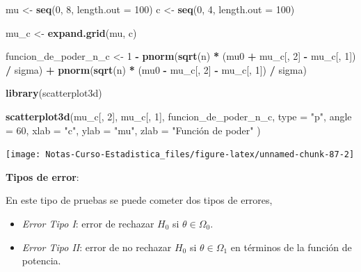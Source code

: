 \documentclass[
  12pt,
]{book}
\newenvironment{Shaded}{\begin{snugshade}}{\end{snugshade}}
\newcommand{\DataTypeTok}[1]{\textcolor[rgb]{0.13,0.29,0.53}{#1}}
\newcommand{\DecValTok}[1]{\textcolor[rgb]{0.00,0.00,0.81}{#1}}
\newcommand{\KeywordTok}[1]{\textcolor[rgb]{0.13,0.29,0.53}{\textbf{#1}}}
\newcommand{\NormalTok}[1]{#1}
\newcommand{\OperatorTok}[1]{\textcolor[rgb]{0.81,0.36,0.00}{\textbf{#1}}}
\newcommand{\StringTok}[1]{\textcolor[rgb]{0.31,0.60,0.02}{#1}}
\begin{document}
\begin{Shaded}
\begin{Highlighting}[]
\NormalTok{mu \textless{}{-}}\StringTok{ }\KeywordTok{seq}\NormalTok{(}\DecValTok{0}\NormalTok{, }\DecValTok{8}\NormalTok{, }\DataTypeTok{length.out =} \DecValTok{100}\NormalTok{)}
\NormalTok{c \textless{}{-}}\StringTok{ }\KeywordTok{seq}\NormalTok{(}\DecValTok{0}\NormalTok{, }\DecValTok{4}\NormalTok{, }\DataTypeTok{length.out =} \DecValTok{100}\NormalTok{)}

\NormalTok{mu\_c \textless{}{-}}\StringTok{ }\KeywordTok{expand.grid}\NormalTok{(mu, c)}

\NormalTok{funcion\_de\_poder\_n\_c \textless{}{-}}\StringTok{ }\DecValTok{1} \OperatorTok{{-}}
\StringTok{  }\KeywordTok{pnorm}\NormalTok{(}\KeywordTok{sqrt}\NormalTok{(n) }\OperatorTok{*}\StringTok{ }\NormalTok{(mu0 }\OperatorTok{+}\StringTok{ }\NormalTok{mu\_c[, }\DecValTok{2}\NormalTok{] }\OperatorTok{{-}}\StringTok{ }\NormalTok{mu\_c[, }\DecValTok{1}\NormalTok{]) }\OperatorTok{/}\StringTok{ }\NormalTok{sigma) }\OperatorTok{+}
\StringTok{  }\KeywordTok{pnorm}\NormalTok{(}\KeywordTok{sqrt}\NormalTok{(n) }\OperatorTok{*}\StringTok{ }\NormalTok{(mu0 }\OperatorTok{{-}}\StringTok{ }\NormalTok{mu\_c[, }\DecValTok{2}\NormalTok{] }\OperatorTok{{-}}\StringTok{ }\NormalTok{mu\_c[, }\DecValTok{1}\NormalTok{]) }\OperatorTok{/}\StringTok{ }\NormalTok{sigma)}

\KeywordTok{library}\NormalTok{(scatterplot3d)}

\KeywordTok{scatterplot3d}\NormalTok{(mu\_c[, }\DecValTok{2}\NormalTok{], mu\_c[, }\DecValTok{1}\NormalTok{], funcion\_de\_poder\_n\_c,}
  \DataTypeTok{type =} \StringTok{"p"}\NormalTok{, }\DataTypeTok{angle =} \DecValTok{60}\NormalTok{,}
  \DataTypeTok{xlab =} \StringTok{"c"}\NormalTok{, }\DataTypeTok{ylab =} \StringTok{"mu"}\NormalTok{, }\DataTypeTok{zlab =} \StringTok{"Función de poder"}
\NormalTok{)}
\end{Highlighting}
\end{Shaded}

\begin{center}\texttt{[image: Notas-Curso-Estadistica\_files/figure-latex/unnamed-chunk-87-2]} \end{center}

\textbf{Tipos de error}:

En este tipo de pruebas se puede cometer dos tipos de errores,

\begin{itemize}
\item
  \emph{Error Tipo I}: error de rechazar \(H_0\) si \(\theta \in \Omega_0\).
\item
  \emph{Error Tipo II}: error de no rechazar \(H_0\) si \(\theta\in\Omega_1\) en términos de la función de potencia.
\end{itemize}
\end{document}
